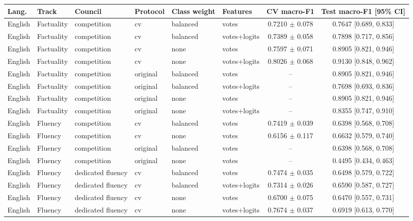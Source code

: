 \begin{tabular}{llllllcc}
\hline
\textbf{Lang.} & \textbf{Track} & \textbf{Council} & \textbf{Protocol} & \textbf{Class weight} & \textbf{Features} & \textbf{CV macro-F1} & \textbf{Test macro-F1 [95\% CI]} \\
\hline
English & Factuality & competition & cv & balanced & votes & 0.7210 $\pm$ 0.078 & 0.7647 [0.689, 0.833] \\
English & Factuality & competition & cv & balanced & votes+logits & 0.7389 $\pm$ 0.058 & 0.7898 [0.717, 0.856] \\
English & Factuality & competition & cv & none & votes & 0.7597 $\pm$ 0.071 & 0.8905 [0.821, 0.946] \\
English & Factuality & competition & cv & none & votes+logits & 0.8026 $\pm$ 0.068 & 0.9130 [0.848, 0.962] \\
English & Factuality & competition & original & balanced & votes & -- & 0.8905 [0.821, 0.946] \\
English & Factuality & competition & original & balanced & votes+logits & -- & 0.7698 [0.693, 0.836] \\
English & Factuality & competition & original & none & votes & -- & 0.8905 [0.821, 0.946] \\
English & Factuality & competition & original & none & votes+logits & -- & 0.8355 [0.747, 0.910] \\
\hline
English & Fluency & competition & cv & balanced & votes & 0.7419 $\pm$ 0.039 & 0.6398 [0.568, 0.708] \\
English & Fluency & competition & cv & none & votes & 0.6156 $\pm$ 0.117 & 0.6632 [0.579, 0.740] \\
English & Fluency & competition & original & balanced & votes & -- & 0.6398 [0.568, 0.708] \\
English & Fluency & competition & original & none & votes & -- & 0.4495 [0.434, 0.463] \\
English & Fluency & dedicated fluency & cv & balanced & votes & 0.7474 $\pm$ 0.035 & 0.6498 [0.579, 0.722] \\
English & Fluency & dedicated fluency & cv & balanced & votes+logits & 0.7314 $\pm$ 0.026 & 0.6590 [0.587, 0.727] \\
English & Fluency & dedicated fluency & cv & none & votes & 0.6700 $\pm$ 0.075 & 0.6470 [0.557, 0.731] \\
English & Fluency & dedicated fluency & cv & none & votes+logits & 0.7674 $\pm$ 0.037 & 0.6919 [0.613, 0.770] \\

\end{tabular}
